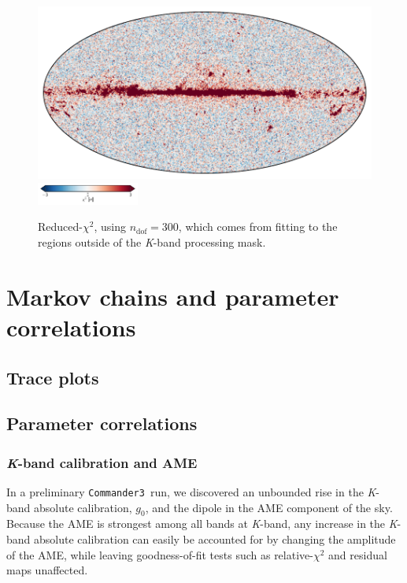 \documentclass[twocolumn]{../../common/aa}
\def\commanderthree{\texttt{Commander3}}
\newcommand{\K}[0]{\textit K}
\begin{document}
\begin{figure}
	\centering
	\includegraphics[width=\linewidth]{figures/chisq_IQU.pdf}
	\newline
	\includegraphics[width=0.3\textwidth]{figures/cbar_3sigma.pdf}
	\caption{Reduced-$\chi^2$, using $n_\mathrm{dof}=300$, which comes from fitting to the regions outside of the \K-band processing mask.}
\end{figure}


\section{Markov chains and parameter correlations}
\label{sec:traceplots}


\subsection{Trace plots}
\label{sec:traceplots}

\lipsum[1]


\subsection{Parameter correlations}
\label{sec:correlations}

\lipsum[5]

\subsubsection{\K-band calibration and AME}
\label{sec:kband_correlation}

In a preliminary \commanderthree\ run, we discovered an unbounded rise in the
\K-band absolute calibration, $g_0$, and the dipole in the AME component of the sky. Because the AME is strongest among all bands at \K-band, any increase in the \K-band absolute calibration can easily be accounted for by changing the amplitude of the AME, while leaving goodness-of-fit tests such as relative-$\chi^2$ and residual maps unaffected.
\end{document}
